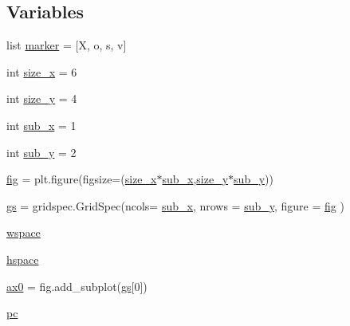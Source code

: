 \subsection*{Variables}
\begin{DoxyCompactItemize}
\item 
list \hyperlink{namespaceSNR__evolution_a2ae96b26da960480c5ebd547790fb97a}{marker} = \mbox{[}\textquotesingle{}X\textquotesingle{}, \textquotesingle{}o\textquotesingle{}, \textquotesingle{}s\textquotesingle{}, \textquotesingle{}v\textquotesingle{}\mbox{]}
\item 
int \hyperlink{namespaceSNR__evolution_a1190521b88fe27a62233af96b1bac53a}{size\+\_\+x} = 6
\item 
int \hyperlink{namespaceSNR__evolution_ac2bd4765206f8c737f95ebab78ae7cac}{size\+\_\+y} = 4
\item 
int \hyperlink{namespaceSNR__evolution_a84d8239381bb2eaf5f5de4124c953059}{sub\+\_\+x} = 1
\item 
int \hyperlink{namespaceSNR__evolution_ac1b49fa093e424c1d814fab4c4d47db3}{sub\+\_\+y} = 2
\item 
\hyperlink{namespaceSNR__evolution_a9cdbf7b3467a14a21b2b5c606e41774a}{fig} = plt.\+figure(figsize=(\hyperlink{namespaceSNR__evolution_a1190521b88fe27a62233af96b1bac53a}{size\+\_\+x}$\ast$\hyperlink{namespaceSNR__evolution_a84d8239381bb2eaf5f5de4124c953059}{sub\+\_\+x},\hyperlink{namespaceSNR__evolution_ac2bd4765206f8c737f95ebab78ae7cac}{size\+\_\+y}$\ast$\hyperlink{namespaceSNR__evolution_ac1b49fa093e424c1d814fab4c4d47db3}{sub\+\_\+y}))
\item 
\hyperlink{namespaceSNR__evolution_a7c849cab581a2471a15771cfab7a0f6c}{gs} = gridspec.\+Grid\+Spec(ncols= \hyperlink{namespaceSNR__evolution_a84d8239381bb2eaf5f5de4124c953059}{sub\+\_\+x}, nrows = \hyperlink{namespaceSNR__evolution_ac1b49fa093e424c1d814fab4c4d47db3}{sub\+\_\+y}, figure = \hyperlink{namespaceSNR__evolution_a9cdbf7b3467a14a21b2b5c606e41774a}{fig} )
\item 
\hyperlink{namespaceSNR__evolution_a7d16472372312dc557927dd2e746213c}{wspace}
\item 
\hyperlink{namespaceSNR__evolution_a2fa00f6ce578b9daa8e1b3bafe699015}{hspace}
\item 
\hyperlink{namespaceSNR__evolution_ae740913980f4ab5c029ead225f54ead8}{ax0} = fig.\+add\+\_\+subplot(\hyperlink{namespaceSNR__evolution_a7c849cab581a2471a15771cfab7a0f6c}{gs}\mbox{[}0\mbox{]})
\item 
\hyperlink{namespaceSNR__evolution_af2f3b2a51d74ef5fa08f36611259fed3}{pc}

\end{DoxyCompactItemize}
